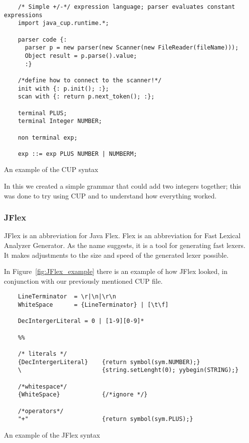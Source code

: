 \begin{listing}[htb!]
  \centering
  \begin{verbatim}
    /* Simple +/-*/ expression language; parser evaluates constant expressions
    import java_cup.runtime.*;

    parser code {:
      parser p = new parser(new Scanner(new FileReader(fileName)));
      Object result = p.parse().value;  
      :}

    /*define how to connect to the scanner!*/
    init with {: p.init(); :};
    scan with {: return p.next_token(); :};

    terminal PLUS;
    terminal Integer NUMBER;

    non terminal exp;

    exp ::= exp PLUS NUMBER | NUMBERM;

  \end{verbatim}
  \caption{An example of the CUP syntax}
  \label{List:cup}
\end{listing}

In this we created a simple grammar that could add two integers together; this was done to try using CUP and to understand how everything worked.


\subsubsection{JFlex}
JFlex is an abbreviation for Java Flex. Flex is an abbreviation for Fast Lexical Analyzer Generator. As the name suggests, it is a tool for generating fast lexers. It makes adjustments to the size and speed of the generated lexer possible.

In Figure~\ref{fig:JFlex_example} there is an example of how JFlex looked, in conjunction with our previously mentioned CUP file.


\begin{listing}[htb!]
  \centering
  \begin{verbatim}
    LineTerminator  = \r|\n|\r\n
    WhiteSpace      = {LineTerminator} | [\t\f]

    DecIntergerLiteral = 0 | [1-9][0-9]*

    %%

    /* literals */
    {DecIntergerLiteral}    {return symbol(sym.NUMBER);}
    \                       {string.setLenght(0); yybegin(STRING);}

    /*whitespace*/ 
    {WhiteSpace}            {/*ignore */}  
    
    /*operators*/
    "+"                     {return symbol(sym.PLUS);}
  \end{verbatim}
  \caption{An example of the JFlex syntax}
  \label{List:jflex}
\end{listing}

